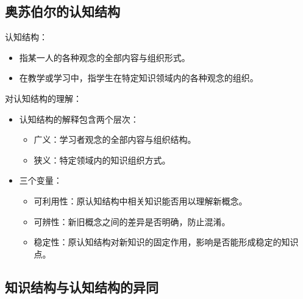 \begin{multicols}{2}
\columnbreak

\subsection{奥苏伯尔的认知结构}

认知结构：
\begin{itemize}
    \item 指某一人的各种观念的全部内容与组织形式。
    \item 在教学或学习中，指学生在特定知识领域内的各种观念的组织。
\end{itemize}

\vspace{\baselineskip}

对认知结构的理解：
\begin{itemize}
    \item 认知结构的解释包含两个层次：
    \begin{itemize}
        \item 广义：学习者观念的全部内容与组织结构。
        \item 狭义：特定领域内的知识组织方式。
    \end{itemize}
    \item 三个变量：
    \begin{itemize}
        \item 可利用性：原认知结构中相关知识能否用以理解新概念。
        \item 可辨性：新旧概念之间的差异是否明确，防止混淆。
        \item 稳定性：原认知结构对新知识的固定作用，影响是否能形成稳定的知识点。
    \end{itemize}
\end{itemize}

\end{multicols}

\subsection{知识结构与认知结构的异同}

